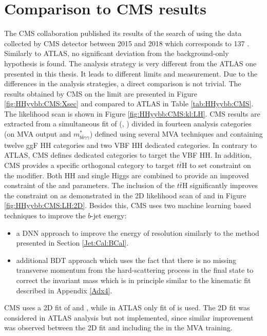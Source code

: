 \section{Comparison to CMS \HHyybb results}
\label{HHyybb:CMS}
The CMS collaboration published its results of the search of \HHyybb using the data collected by CMS detector between 2015 and 2018 which corresponds to 137 \ifb \cite{CMS_yybb}. Similarly to ATLAS, no significant deviation from the background-only hypothesis is found. The analysis strategy is very different from the ATLAS one presented in this thesis. It leads to different limits and \kl measurement. Due to the differences in the analysis strategies, a direct comparison is not trivial. The results obtained by CMS on the limit are presented in Figure \ref{fig:HHyybb:CMS:Xsec} and compared to ATLAS in Table \ref{tab:HHyybb:CMS}. The \kl likelihood scan is shown in Figure \ref{fig:HHyybb:CMS:kl:LH}. CMS results are extracted from a simultaneous fit of (\myy, \mbb) divided in fourteen analysis categories (on MVA output and $m_{b \bar{b} \gamma \gamma}^{*}$) defined using several MVA techniques and containing twelve ggF HH categories and two VBF HH dedicated categories. In contrary to ATLAS, CMS defines dedicated categories to target the VBF HH. In addition, CMS provides a specific orthogonal category to target $t\bar{t}$H to set constraint on the \kt modifier. Both HH and single Higgs are combined to provide an improved constraint of the \kl and \kt parameters. The inclusion of the $t\bar{t}$H significantly improves the constraint on \kt as demonstrated in the 2D likelihood scan of \kl and \kt in Figure \ref{fig:HHyybb:CMS:LH:2D}. Besides this, CMS uses two machine learning based techniques to improve the $b$-jet energy:
\begin{itemize}
    \item a DNN approach to improve the energy of resolution similarly to the method presented in Section \ref{Jet:Cal:BCal}.
    \item additional BDT approach which uses the fact that there is no missing transverse momentum from the hard-scattering process in the \HHyybb final state to correct the \mbb invariant mass which is in principle similar to the kinematic fit described in Appendix \ref{Adx4}.
\end{itemize}
CMS uses a 2D fit of \myy and \mbb, while in ATLAS only fit of \myy is used. The 2D fit was considered in ATLAS analysis but not implemented, since similar improvement was observed between the 2D fit and including the \mbb in the MVA training.


